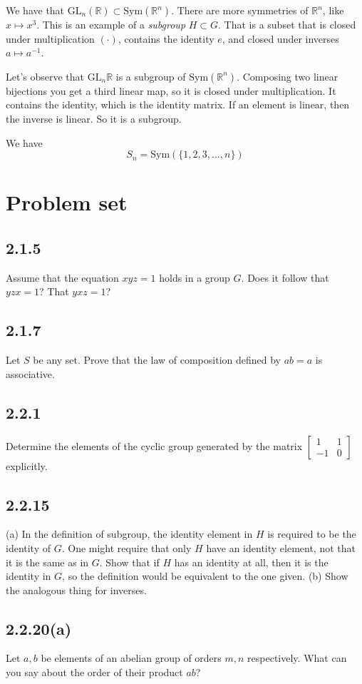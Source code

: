 \documentclass[12pt]{article}
\newcommand{\RR}{\mathbb{R}}
\newcommand{\GL}{\text{GL}}
\newcommand{\inv}[1]{#1^{-1}}
\theoremstyle{definition}
\begin{document}
We have that \( \GL_n(\RR) \subset \text{Sym}(\RR^n) \). There are more symmetries of \( \RR^n \), like
\( x \mapsto x^3 \). This is an example of a \emph{subgroup} \( H \subset G \). That is a subset
that is closed under multiplication \( (\cdot) \), contains the identity \(e\), and closed under inverses \(a\mapsto\inv{a}\).

Let's observe that \(\GL_n\RR \) is a subgroup of \(\text{Sym}(\RR^n)\). Composing
two linear bijections you get a third linear map, so it is closed under multiplication.
It contains the identity, which is the identity matrix. If an element is linear, then the inverse is linear. So it is a subgroup.

We have \[ S_n = \text{Sym}(\{1,2,3,\ldots,n\}) \]

\section*{Problem set}
\subsection*{2.1.5}
Assume that the equation \(xyz = 1\) holds in a group \(G\). Does it follow that \(yzx = 1\)? That \(yxz = 1\)?
\subsection*{2.1.7}
Let \(S\) be any set. Prove that the law of composition defined by \(ab = a\) is associative.
\subsection*{2.2.1}
Determine the elements of the cyclic group generated by the matrix \(\left[\begin{smallmatrix}
   1 & 1\\
   -1 & 0 
\end{smallmatrix}\right]\) explicitly.
\subsection*{2.2.15}
(a) In the definition of subgroup, the identity element in \(H\) is required to be the identity of \(G\).
One might require that only \(H\) have an identity element, not that it is the same as in \(G\).
Show that if \(H\) has an identity at all, then it is the identity in \(G\), so the definition would be
equivalent to the one given.
(b) Show the analogous thing for inverses.
\subsection*{2.2.20(a)}
Let \(a, b\) be elements of an abelian group of orders \(m, n\) respectively. What can you say about the order
of their product \(ab\)?
\end{document}

